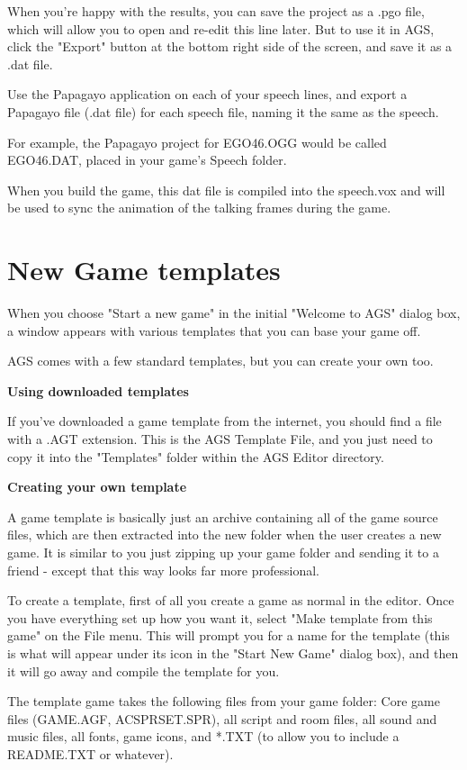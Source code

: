 When you're happy with the results, you can save the project as a .pgo file, which will allow you
to open and re-edit this line later. But to use it in AGS, click the "Export" button at the
bottom right side of the screen, and save it as a .dat file.

Use the Papagayo application on each of your speech lines, and export a Papagayo file (.dat file)
for each speech file, naming it the same as the speech.

For example, the Papagayo project for EGO46.OGG would be called EGO46.DAT, placed in your game's
Speech folder.

When you build the game, this dat file is compiled into the speech.vox and will be used to sync
the animation of the talking frames during the game.


\section{New Game templates}%

When you choose "Start a new game" in the initial "Welcome to AGS" dialog
box, a window appears with various templates that you can base your game off.

AGS comes with a few standard templates, but you can create your own too.

\bf{Using downloaded templates}

If you've downloaded a game template from the internet, you should find a file with
a .AGT extension. This is the AGS Template File, and you just need to copy it into
the "Templates" folder within the AGS Editor directory.

\bf{Creating your own template}

A game template is basically just an archive containing all of the game source files,
which are then extracted into the new folder when the user creates a new game. It is
similar to you just zipping up your game folder and sending it to a friend - except that
this way looks far more professional.

To create a template, first of all you create a game as normal in the editor. Once you
have everything set up how you want it, select "Make template from this game" on the File
menu. This will prompt you for a name for the template (this is what will appear under its
icon in the "Start New Game" dialog box), and then it will go away and compile the template
for you.

The template game takes the following files from your game folder:
Core game files (GAME.AGF, ACSPRSET.SPR), all script and room files, all sound and music
files, all fonts, game icons, and *.TXT (to allow you to include a README.TXT or whatever).

